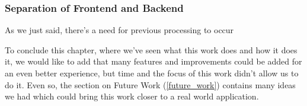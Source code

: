 {\subsubsection{Separation of Frontend and Backend}

As we just said, there's a need for previous processing to occur


} %









\vspace{2 em}


To conclude this chapter, where we've seen what this work does and how it does it, we would like to add that many features and improvements could be added for an even better experience, but time and the focus of this work didn't allow us to do it. Even so, the section on Future Work (\ref{future_work}) contains many ideas we had which could bring this work closer to a real world application.






